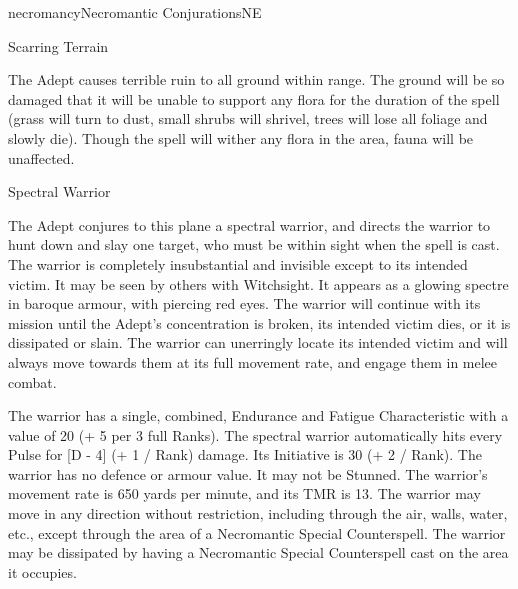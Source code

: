 \begin{College}[1.1]{necromancy}{Necromantic Conjurations}{NE}
\begin{spell}[S-11]{Scarring Terrain}

\begin{effects}
The Adept causes terrible ruin to all ground within range.  The ground
will be so damaged that it will be unable to support any flora for the
duration of the spell (grass will turn to dust, small shrubs will
shrivel, trees will lose all foliage and slowly die).  Though the
spell will wither any flora in the area, fauna will be unaffected.
\end{effects}
\end{spell}

\begin{spell}[S-12]{Spectral Warrior}

\begin{effects}
The Adept conjures to this plane a spectral warrior, and directs the
warrior to hunt down and slay one target, who must be within sight
when the spell is cast.  The warrior is completely insubstantial and
invisible except to its intended victim.  It may be seen by others
with Witchsight.  It appears as a glowing spectre in baroque armour,
with piercing red eyes.  The warrior will continue with its mission
until the Adept’s concentration is broken, its intended victim dies,
or it is dissipated or slain.  The warrior can unerringly locate its
intended victim and will always move towards them at its full movement
rate, and engage them in melee combat.

The warrior has a single, combined, Endurance and Fatigue
Characteristic with a value of 20 (+ 5 per 3 full Ranks).  The
spectral warrior automatically hits every Pulse for [D - 4] (+ 1 /
Rank) damage. Its Initiative is 30 (+ 2 / Rank). The warrior has no
defence or armour value. It may not be Stunned.  The warrior’s
movement rate is 650 yards per minute, and its TMR is 13.  The warrior
may move in any direction without restriction, including through the
air, walls, water, etc., except through the area of a Necromantic
Special Counterspell. The warrior may be dissipated by having a
Necromantic Special Counterspell cast on the area it occupies.
\end{effects}
\end{spell}


\end{College}
